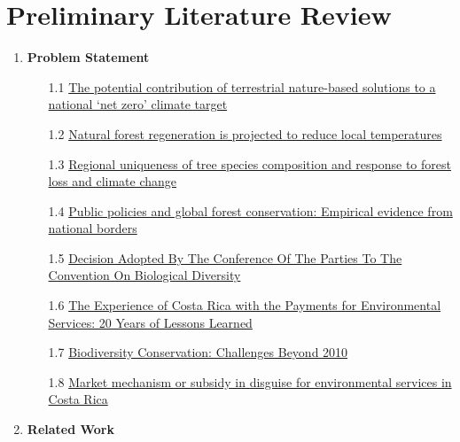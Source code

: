 
\section{Preliminary Literature Review}
\label{appex:literature-review}

\begin{enumerate}
    \item \textbf{Problem Statement}
        \begin{enumerate}
            \item [1.1] \href{https://doi.org/10.1111/1365-2664.14003}{The potential contribution of terrestrial nature-based solutions to a national ‘net zero’ climate target}
            \item [1.2] \href{https://doi.org/10.1038/s43247-024-01737-5}{Natural forest regeneration is projected to reduce local temperatures}
            \item [1.3] \href{https://doi.org/10.1038/s41467-024-48276-3}{Regional uniqueness of tree species composition and response to forest loss and climate change}
            \item [1.4] \href{https://doi.org/10.1016/j.gloenvcha.2023.102770}{Public policies and global forest conservation: Empirical evidence from national borders}
            \item [1.5] \href{https://www.cbd.int/doc/decisions/cop-14/cop-14-dec-34-en.pdf}{Decision Adopted By The Conference Of The Parties To The Convention On Biological Diversity}
            \item [1.6] \href{http://dx.doi.org/10.15359/rca.51-2.11}{The Experience of Costa Rica with the Payments for Environmental Services: 20 Years of Lessons Learned}
            \item [1.7] \href{https://doi.org/10.1126/science.1189138}{Biodiversity Conservation: Challenges Beyond 2010}
            \item [1.8] \href{https://doi.org/10.1016/j.geoforum.2011.11.008}{Market mechanism or subsidy in disguise for environmental services in Costa Rica}
        \end{enumerate}

    \item \textbf{Related Work}
            
    \begin{enumerate}


\end{enumerate}
\end{enumerate}
